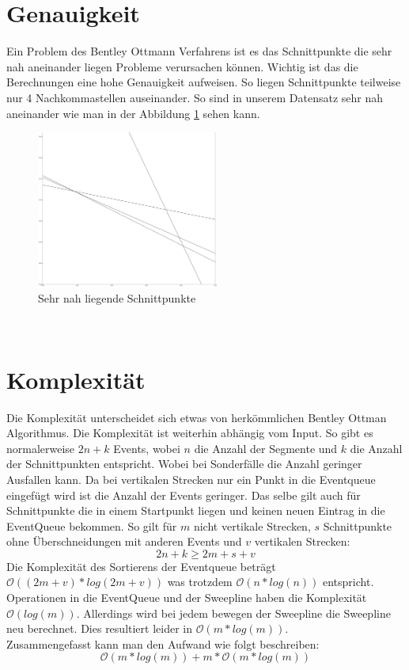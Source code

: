 \documentclass[conference]{IEEEtran}
\begin{document}
	\section{Genauigkeit}
	Ein Problem des Bentley Ottmann Verfahrens ist es das Schnittpunkte die sehr nah aneinander liegen Probleme verursachen können. Wichtig ist das die Berechnungen eine hohe Genauigkeit aufweisen. So liegen Schnittpunkte teilweise nur 4 Nachkommastellen auseinander. So sind in unserem Datensatz sehr nah aneinander wie man in der Abbildung \ref{close} sehen kann.
	\begin{figure}[h]
		\begin{center}
			\includegraphics[width=6cm]{CloseIntersections.png}
			\caption{Sehr nah liegende Schnittpunkte}
			\label{close}
		\end{center}
	\end{figure}\\
	\section{Komplexität}
	Die Komplexität unterscheidet sich etwas von herkömmlichen Bentley Ottman Algorithmus. Die Komplexität ist weiterhin abhängig vom Input. So gibt es normalerweise $2n + k$ Events, wobei $n$ die Anzahl der Segmente und $k$ die Anzahl der Schnittpunkten entspricht. Wobei bei Sonderfälle die Anzahl geringer Ausfallen kann. Da bei vertikalen Strecken nur ein Punkt in die Eventqueue eingefügt wird ist die Anzahl der Events geringer. Das selbe gilt auch für Schnittpunkte die in einem Startpunkt liegen und keinen neuen Eintrag in die EventQueue bekommen. So gilt für $m$ nicht vertikale Strecken, $s$ Schnittpunkte ohne Überschneidungen mit anderen Events und $v$ vertikalen Strecken:
	\[ 2n + k \geq 2m + s + v \]
	Die Komplexität des Sortierens der Eventqueue beträgt $\mathcal{O}((2m+v)*log(2m+v))$ was trotzdem $\mathcal{O}(n*log(n))$ entspricht.\\
	Operationen in die EventQueue und der Sweepline haben die Komplexität $\mathcal{O}(log(m))$. Allerdings wird bei jedem bewegen der Sweepline die Sweepline neu berechnet. Dies resultiert leider in $\mathcal{O}(m*log(m))$.\\
	Zusammengefasst kann man den Aufwand wie folgt beschreiben:
	\[\mathcal{O}(m*log(m)) + m*\mathcal{O}(m*log(m)) \]
	
\end{document}
